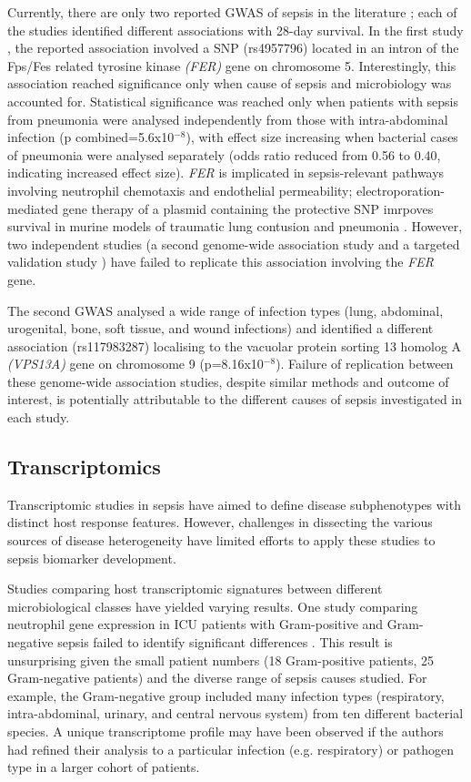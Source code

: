 Currently, there are only two reported GWAS of sepsis in the literature \parencite{Rautanen2015} \parencite{Scherag2016}; each of the studies identified different associations with 28-day survival. In the first study \parencite{Rautanen2015}, the reported association involved a SNP (rs4957796) located in an intron of the Fps/Fes related tyrosine kinase \textit{(FER)} gene on chromosome 5. Interestingly, this association reached significance only when cause of sepsis and microbiology was accounted for. Statistical significance was reached only when patients with sepsis from pneumonia were analysed independently from those with intra-abdominal infection (p combined=5.6x10$^{-8}$), with effect size increasing when bacterial cases of pneumonia were analysed separately (odds ratio reduced from 0.56 to 0.40, indicating increased effect size). \textit{FER} is implicated in sepsis-relevant pathways involving neutrophil chemotaxis and endothelial permeability; electroporation-mediated gene therapy of a plasmid containing the protective SNP imrpoves survival in murine models of traumatic lung contusion and pneumonia \parencite{Dolgachev2016}. However, two independent studies (a second genome-wide association study \parencite{Scherag2016} and a targeted validation study \parencite{Schoneweck2015}) have failed to replicate this association involving the \textit{FER} gene. 

The second GWAS \parencite{Scherag2016} analysed a wide range of infection types (lung, abdominal, urogenital, bone, soft tissue, and wound infections) and identified a different association (rs117983287) localising to the vacuolar protein sorting 13 homolog A \textit{(VPS13A)} gene on chromosome 9 (p=8.16x10$^{-8}$). Failure of replication between these genome-wide association studies, despite similar methods and outcome of interest, is potentially attributable to the different causes of sepsis investigated in each study. 

\subsection{Transcriptomics}
Transcriptomic studies in sepsis have aimed to define disease subphenotypes with distinct host response features. However, challenges in dissecting the various sources of disease heterogeneity have limited efforts to apply these studies to sepsis biomarker development. 

Studies comparing host transcriptomic signatures between different microbiological classes have yielded varying results. One study comparing neutrophil gene expression in ICU patients with Gram-positive and Gram-negative sepsis failed to identify significant differences \parencite{Tang2008}. This result is unsurprising given the small patient numbers (18 Gram-positive patients, 25 Gram-negative patients) and the diverse range of sepsis causes studied. For example, the Gram-negative group included many infection types (respiratory, intra-abdominal, urinary, and central nervous system) from ten different bacterial species. A unique transcriptome profile may have been observed if the authors had refined their analysis to a particular infection (e.g. respiratory) or pathogen type in a larger cohort of patients. 

